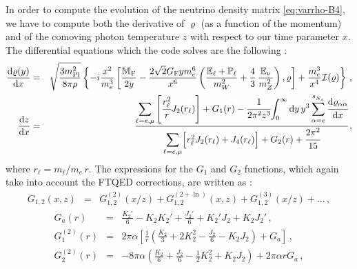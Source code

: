 \documentclass[notitlepage,nofootinbib,showpacs,preprintnumbers,amsmath,amssymb,superscriptaddress,prd,onecolumn]{revtex4-1}
\begin{document}
In order to compute the evolution of the neutrino density matrix \eqref{eq:varrho-B4},
we have to compute both the derivative of $\varrho$ (as a function of the momentum)
and of the comoving photon temperature $z$
with respect to our time parameter $x$.
The differential equations which the code solves are the following
\cite{deSalas:2016ztq,Mirizzi:2012we,Saviano:2013ktj,Mangano:2001iu}:
%
\begin{eqnarray}\label{eq:drho_dx_nxn}
\frac{{\rm d}\varrho(y)}{{\rm d}x}
&=&
\sqrt{\frac{3 m^2_{\rm Pl}}{8\pi\rho}}
\left\{
    -i \frac{x^2}{m_e^3}
    \left[
        \frac{\mathbb{M}_{\rm F}}{2y}
        -
        \frac{2\sqrt{2}G_{\rm F} y m_e^6}{x^6}
        \left(
            \frac{\mathbb{E}_\ell+\mathbb{P}_\ell}{m_W^2}
            +
            \frac{4}{3}\,\frac{\mathbb{E}_\nu}{m_Z^2}
        \right),
    \varrho
    \right]
    +\frac{m_e^3}{x^4}\mathcal{I(\varrho)}
\right\}\,,
\nonumber\\
\label{eq:dz_dx_nxn}
\frac{\mathrm{d}z}{\mathrm{d}x}
&=&
\cfrac{
{\displaystyle \sum_{\ell=e,\mu}}
\left[
\cfrac{r_\ell^2}{r} J_2(r_\ell)
\right]
+ G_1(r)
- \cfrac{1}{2\pi^2z^3}
    {\displaystyle \int_0^\infty \mathrm{d}y\,y^3\sum_{\alpha=e}^{s_{N_s}^{}}\cfrac{\mathrm{d}\varrho_{\alpha \alpha}}{\mathrm{d}x}}
}{
{\displaystyle \sum_{\ell=e,\mu}}
\Big[
r^2_\ell J_2(r_\ell)
+ J_4(r_\ell)
\Big]
+ G_2(r)
+ \cfrac{2\pi^2}{15}
}\,,
\end{eqnarray}
where $r_\ell=m_\ell/m_e\,r$.
The expressions for the $G_1$ and $G_2$ functions,
which again take into account the FTQED corrections, are written as
\cite{Mangano:2001iu,Bennett:2019ewm}:
%
\begin{eqnarray}
G_{1,2}(x,z)
&=&
G_{1,2}^{(2)}(x/z)
+
G_{1,2}^{(2+\ln)}(x,z)
+
G_{1,2}^{(3)}(x/z)
+
\ldots
\,,
\end{eqnarray}
%
\begin{eqnarray}
G_a(r)
&=&
\frac{K_2'}{6}
-K_2K_2'
+\frac{J_2'}{6}
+K_2'J_2
+K_2J_2'
\,,\\
G_1^{(2)}(r)
&=&
2\pi\alpha
\left[
  \frac{1}{r}
  \left(
    \frac{K_2}{3}
    + 2 K_2^2
    -\frac{J_2}{6}
    -K_2J_2
  \right)
  +
  G_a
\right]
\label{eq:g1}
\,,\\
G_2^{(2)}(r)
&=&
-8\pi\alpha
\left(
  \frac{K_2}{6}
  +\frac{J_2}{6}
  -\frac{1}{2}K_2^2
  +K_2J_2
\right)
+
2\pi\alpha r
G_a
\label{eq:g2}
\,,
\end{eqnarray}
%
\end{document}
